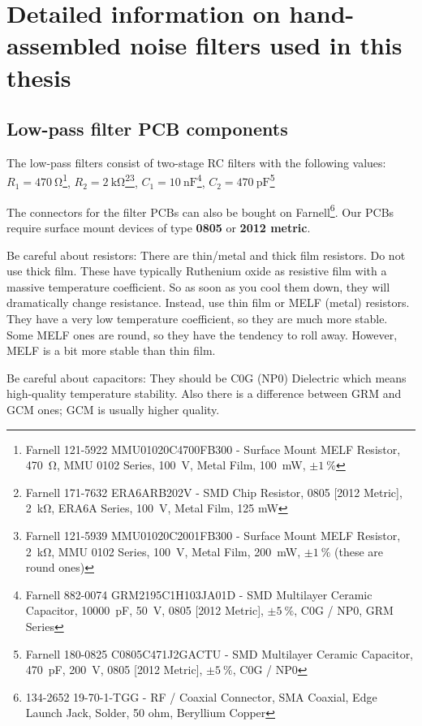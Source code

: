 \chapter{Detailed information on hand-assembled noise filters used in this thesis}
\clearpage
\section{Low-pass filter PCB components}\label{app:lowpassfilter}

The low-pass filters consist of two-stage RC filters with the following values:
$R_1=\SI{470}{\ohm}$\footnote{Farnell 121-5922 MMU01020C4700FB300 - Surface Mount MELF Resistor, \SI{470}{\ohm}, MMU 0102 Series, \SI{100}{V}, Metal Film, \SI{100}{\milli\watt}, $\pm\SI{1}{\percent}$}, $R_2=\SI{2}{\kilo\ohm}$\footnote{Farnell 171-7632 ERA6ARB202V - SMD Chip Resistor, 0805 [2012 Metric], \SI{2}{\kilo\ohm}, ERA6A Series, \SI{100}{V}, Metal Film, 125 mW}\footnote{Farnell 121-5939 MMU01020C2001FB300 - Surface Mount MELF Resistor, \SI{2}{\kilo\ohm}, MMU 0102 Series, \SI{100}{V}, Metal Film, \SI{200}{\milli\watt}, $\pm\SI{1}{\percent}$ (these are round ones)}, $C_1=\SI{10}{\nano\farad}$\footnote{Farnell 882-0074 GRM2195C1H103JA01D - SMD Multilayer Ceramic Capacitor, \SI{10000}{\pico\farad}, \SI{50}{V}, 0805 [2012 Metric], $\pm\SI{5}{\percent}$, C0G / NP0, GRM Series}, $C_2=\SI{470}{\pico\farad}$\footnote{Farnell 180-0825 C0805C471J2GACTU - SMD Multilayer Ceramic Capacitor, \SI{470}{\pico\farad}, \SI{200}{V}, 0805 [2012 Metric], $\pm\SI{5}{\percent}$, C0G / NP0}

The connectors for the filter PCBs can also be bought on Farnell\footnote{134-2652 19-70-1-TGG - RF / Coaxial Connector, SMA Coaxial, Edge Launch Jack, Solder, 50 ohm, Beryllium Copper}. Our PCBs require surface mount devices of type \textbf{0805} or \textbf{2012 metric}.

Be careful about resistors: There are thin/metal and thick film resistors. Do not use thick film. These have typically Ruthenium oxide as resistive film with a massive temperature coefficient. So as soon as you cool them down, they will dramatically change resistance. Instead, use thin film or MELF (metal) resistors. They have a very low temperature coefficient, so they are much more stable. Some MELF ones are round, so they have the tendency to roll away. However, MELF is a bit more stable than thin film.

Be careful about capacitors: They should be C0G (NP0) Dielectric which means high-quality temperature stability. Also there is a difference between GRM and GCM ones; GCM is usually higher quality.

